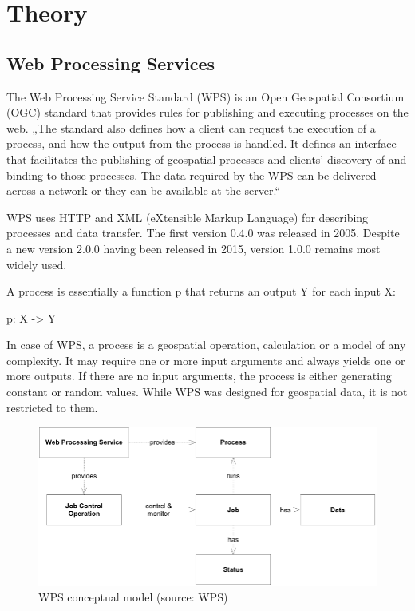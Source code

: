 \chapter{Theory}
\label{2-teorie}

\section{Web Processing Services}

The Web Processing Service Standard (WPS) is an Open Geospatial
Consortium (OGC) standard that provides rules for publishing and
executing processes on the web. „The standard also defines how a
client can request the execution of a process, and how the output from
the process is handled. It defines an interface that facilitates the
publishing of geospatial processes and clients’ discovery of and
binding to those processes. The data required by the WPS can be
delivered across a network or they can be available at the server.“
\cite{wpsstandard}

WPS uses HTTP and XML (eXtensible Markup Language) for describing
processes and data transfer. The first version 0.4.0 was released in
2005. Despite a new version 2.0.0 having been released in 2015,
version 1.0.0 remains most widely used.

A process is essentially a function p that returns an output Y for
each input X:\\ \centerline{p: X -> Y}

In case of WPS, a process is a geospatial operation, calculation or a
model of any complexity. It may require one or more input arguments
and always yields one or more outputs. If there are no input
arguments, the process is either generating constant or random
values. While WPS was designed for geospatial data, it is not
restricted to them.

\begin{figure}[H] \centering
      \includegraphics[width=400pt]{./pictures/wps_conceptual_model.png}
      \caption[QGIS logo]{WPS conceptual model (source: WPS)}
      \label{fig:WPS}
  \end{figure}



